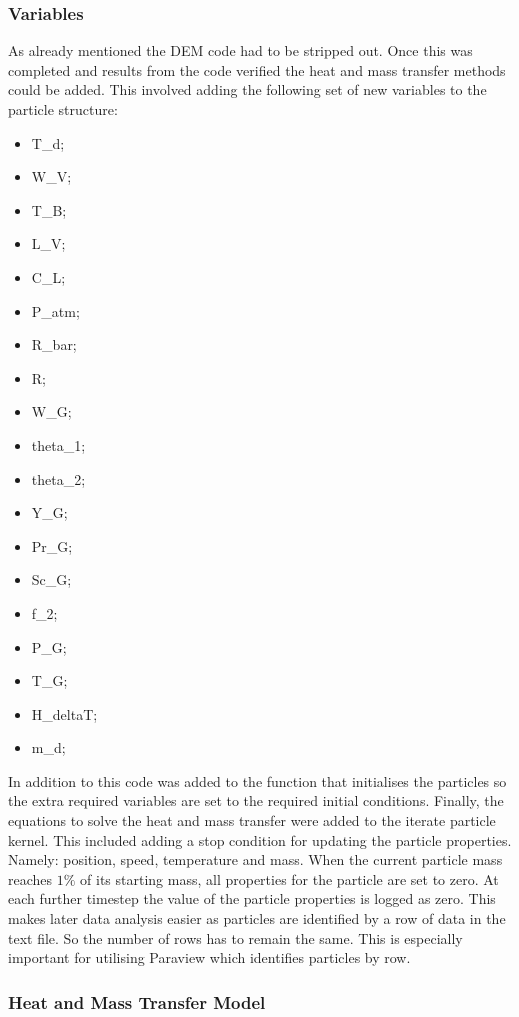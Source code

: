 \documentclass[../Interim_Report_Master]{subfiles}
\begin{document}
\subsubsection{Variables}
As already mentioned the DEM code had to be stripped out. Once this was completed and results from the code verified the heat and mass transfer methods could be added. This involved adding the following set of new variables to the particle structure:
\begin{multicols}{3}
\begin{itemize}
	\item T\_d;
	\item W\_V;
	\item T\_B;
	\item L\_V;
	\item C\_L;
	\item P\_atm;
	\item R\_bar;
	\item R;
	\item W\_G;
	\item theta\_1;
	\item theta\_2;
	\item Y\_G;
	\item Pr\_G;
	\item Sc\_G;
	\item f\_2;
	\item P\_G;
	\item T\_G;
	\item H\_deltaT;
	\item m\_d;
\end{itemize} 
\end{multicols}


In addition to this code was added to the function that initialises the particles so the extra required variables are set to the required initial conditions. Finally, the equations to solve the heat and mass transfer were added to the iterate particle kernel. This included adding a stop condition for updating the particle properties. Namely: position, speed, temperature and mass. When the current particle mass reaches $1\%$ of its starting mass, all properties for the particle are set to zero. At each further timestep the value of the particle properties is logged as zero. This makes later data analysis easier as particles are identified by a row of data in the text file. So the number of rows has to remain the same. This is especially important for utilising Paraview which identifies particles by row.  

\subsubsection{Heat and Mass Transfer Model}
\end{document}
